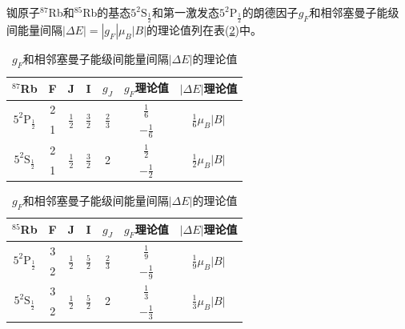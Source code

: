 \documentclass[a4paper]{article}
\begin{document}
铷原子$^{87}$Rb和$^{85}$Rb的基态$5^2\text{S}_{\frac{1}{2}}$和第一激发态$5^2\text{P}_{\frac{1}{2}}$的朗德因子$g_F$和相邻塞曼子能级间能量间隔$|\Delta E| = |g_F|\mu_B|B|$的理论值列在表(\ref{table1})中。
\begin{table}[!h]
\centering
\caption{$g_F$和相邻塞曼子能级间能量间隔$|\Delta E|的理论值$}\label{table1}
\begin{tabular}{|c|c|c|c|c|c|c|}
\hline
$^{87}$Rb                                    & F & J                          & I                          & $g_J$                       & $g_F$理论值   & $|\Delta E|$理论值                    \\ \hline
\multirow{2}{*}{$5^2\text{P}_{\frac{1}{2}}$} & 2 & \multirow{2}{*}{$\frac12$} & \multirow{2}{*}{$\frac32$} & \multirow{2}{*}{$\frac23$} & $\frac16$  & \multirow{2}{*}{$\frac16\mu_B|B|$} \\ \cline{2-2} \cline{6-6}
                                             & 1 &                            &                            &                             & $-\frac16$ &                                    \\ \hline
\multirow{2}{*}{$5^2\text{S}_{\frac{1}{2}}$} & 2 & \multirow{2}{*}{$\frac12$} & \multirow{2}{*}{$\frac32$} & \multirow{2}{*}{2}          & $\frac12$  & \multirow{2}{*}{$\frac12\mu_B|B|$} \\ \cline{2-2} \cline{6-6}
                                             & 1 &                            &                            &                             & $-\frac12$ &                                    \\ \hline
\end{tabular}

\begin{tabular}{|c|c|c|c|c|c|c|}
\hline
$^{85}$Rb                                    & F & J                          & I                          & $g_J$                      & $g_F$理论值   & $|\Delta E|$理论值                    \\ \hline
\multirow{2}{*}{$5^2\text{P}_{\frac{1}{2}}$} & 3 & \multirow{2}{*}{$\frac12$} & \multirow{2}{*}{$\frac52$} & \multirow{2}{*}{$\frac23$} & $\frac19$  & \multirow{2}{*}{$\frac19\mu_B|B|$} \\ \cline{2-2} \cline{6-6}
                                             & 2 &                            &                            &                            & $-\frac19$ &                                    \\ \hline
\multirow{2}{*}{$5^2\text{S}_{\frac{1}{2}}$} & 3 & \multirow{2}{*}{$\frac12$} & \multirow{2}{*}{$\frac52$} & \multirow{2}{*}{2}         & $\frac13$  & \multirow{2}{*}{$\frac13\mu_B|B|$} \\ \cline{2-2} \cline{6-6}
                                             & 2 &                            &                            &                            & $-\frac13$ &                                    \\ \hline
\end{tabular}
\end{table}
\end{document}
